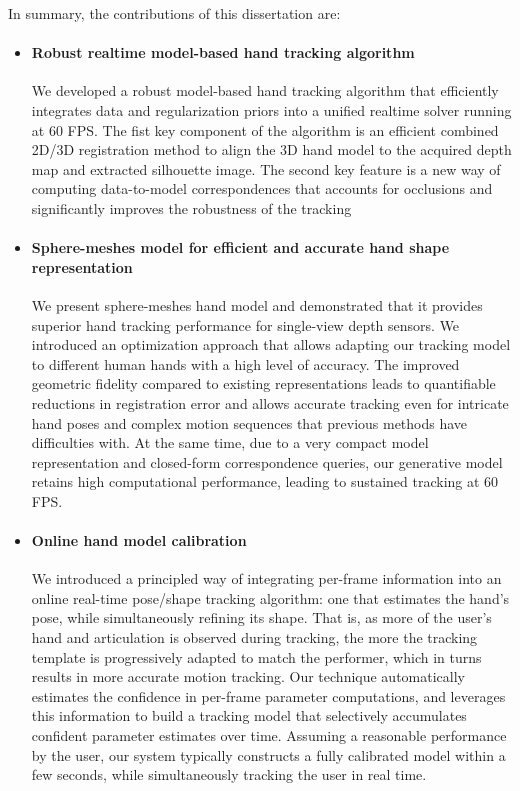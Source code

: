 In summary, the contributions of this dissertation are:
\begin{itemize}

\item \paragraph{Robust realtime model-based hand tracking algorithm}
We developed a robust model-based hand tracking algorithm that efficiently integrates data and regularization priors into a unified realtime solver running at 60 FPS. The fist key component of the algorithm is an efficient combined 2D/3D registration method to align the 3D hand model to the acquired depth map and extracted silhouette image. The second key feature is a new way of computing data-to-model correspondences that accounts for occlusions and significantly improves the robustness of the tracking

\item \paragraph{Sphere-meshes model for efficient and accurate hand shape representation}
We present sphere-meshes hand model and demonstrated that it provides superior hand tracking performance for single-view depth sensors. We introduced an optimization approach that allows adapting our tracking model to different human hands with a high level of accuracy. The improved geometric fidelity compared to existing representations leads to quantifiable reductions in registration error and allows accurate tracking even for intricate hand poses and complex motion sequences that previous methods have difficulties with. At the same time, due to a very compact model representation and closed-form correspondence queries, our generative model retains high computational performance, leading to sustained tracking at 60 FPS.

\item \paragraph{Online hand model calibration} 
We introduced a principled way of integrating per-frame information into an online real-time pose/shape tracking algorithm: one that estimates the hand’s pose, while simultaneously refining its shape. That is, as more of the user’s hand and articulation is observed during tracking, the more the tracking template is progressively adapted to match the performer, which in turns results in more accurate motion tracking. Our technique automatically estimates the confidence in per-frame parameter computations, and leverages this information to build a tracking model that selectively accumulates confident parameter estimates over time. Assuming a reasonable performance by the user, our system typically constructs a fully calibrated model within a few seconds, while simultaneously tracking the user in real time. 


\end{itemize}
